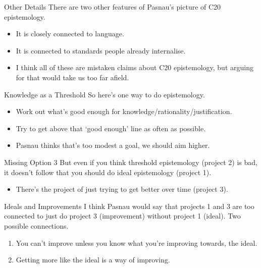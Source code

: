 \documentclass[
  17pt,
  letterpaper,
  ignorenonframetext,
  aspectratio=169,
]{beamer}
\providecommand{\tightlist}{%
  \setlength{\itemsep}{0pt}\setlength{\parskip}{0pt}}\usepackage{longtable,booktabs,array}
\begin{document}
\begin{frame}{Other Details}
\protect\hypertarget{other-details}{}
There are two other features of Pasnau's picture of C20 epistemology.

\begin{itemize}[<+->]
\item
  It is closely connected to language.
\item
  It is connected to standards people already internalise.
\item
  I think all of these are mistaken claims about C20 epistemology, but
  arguing for that would take us too far afield.
\end{itemize}
\end{frame}

\begin{frame}{Knowledge as a Threshold}
\protect\hypertarget{knowledge-as-a-threshold}{}
So here's one way to do epistemology.

\begin{itemize}[<+->]
\tightlist
\item
  Work out what's good enough for knowledge/rationality/justification.
\item
  Try to get above that `good enough' line as often as possible.
\item
  Pasnau thinks that's too modest a goal, we should aim higher.
\end{itemize}
\end{frame}

\begin{frame}{Missing Option 3}
\protect\hypertarget{missing-option-3}{}
But even if you think threshold epistemology (project 2) is bad, it
doesn't follow that you should do ideal epistemology (project 1).

\begin{itemize}[<+->]
\tightlist
\item
  There's the project of just trying to get better over time (project
  3).
\end{itemize}
\end{frame}

\begin{frame}{Ideals and Improvements}
\protect\hypertarget{ideals-and-improvements}{}
I think Pasnau would say that projects 1 and 3 are too connected to just
do project 3 (improvement) without project 1 (ideal). Two possible
connections.

\begin{enumerate}[<+->]
\tightlist
\item
  You can't improve unless you know what you're improving towards, the
  ideal.
\item
  Getting more like the ideal is a way of improving.
\end{enumerate}
\end{frame}
\end{document}
